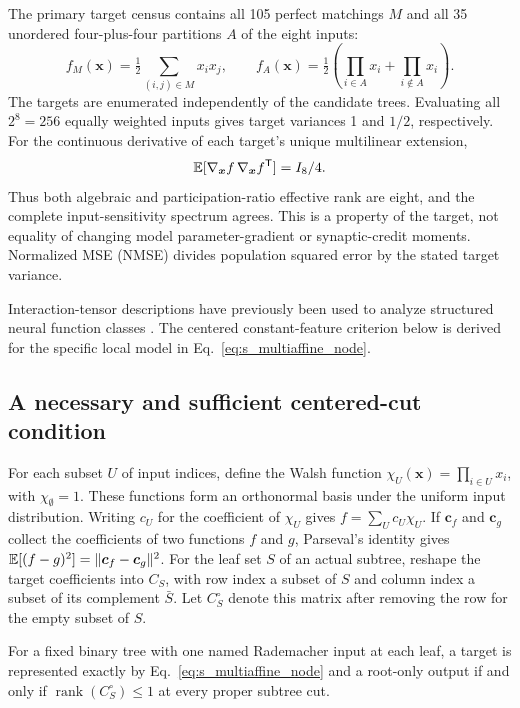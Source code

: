 The primary target census contains all 105 perfect matchings $M$ and all
35 unordered four-plus-four partitions $A$ of the eight inputs:
\begin{equation}
 f_M(\bm x)=\tfrac12\sum_{(i,j)\in M}x_ix_j,
 \qquad
 f_A(\bm x)=\tfrac12\left(\prod_{i\in A}x_i+
                              \prod_{i\notin A}x_i\right).
 \label{eq:s_interaction_targets}
\end{equation}
The targets are enumerated independently of the candidate trees. Evaluating
all $2^8=256$ equally weighted inputs gives target variances 1 and $1/2$,
respectively. For the continuous derivative of each target's unique
multilinear extension,
\begin{equation}
 \mathbb{E}[\nabla_{\bm x}f\,\nabla_{\bm x}f^{\mathsf T}]=I_8/4.
 \label{eq:s_equal_input_sensitivity}
\end{equation}
Thus both algebraic and participation-ratio effective rank are eight, and
the complete input-sensitivity spectrum agrees. This is a property of the
target, not equality of changing model parameter-gradient or synaptic-credit
moments. Normalized MSE (NMSE) divides population squared error by the stated
target variance.

Interaction-tensor descriptions have previously been used to analyze
structured neural function classes \citep{cohen2016tensor}. The centered
constant-feature criterion below is derived for the specific local model in
Eq.~\ref{eq:s_multiaffine_node}.

\subsection{A necessary and sufficient centered-cut condition}
\label{note:centered_cut_theorem}

For each subset $U$ of input indices, define the Walsh function
$\chi_U(\bm x)=\prod_{i\in U}x_i$, with $\chi_\emptyset=1$. These
functions form an orthonormal basis under the uniform input distribution.
Writing $c_U$ for the coefficient of $\chi_U$ gives
$f=\sum_U c_U\chi_U$. If $\bm c_f$ and $\bm c_g$ collect the
coefficients of two functions $f$ and $g$, Parseval's identity gives
$\mathbb{E}[(f-g)^2]=\|\bm c_f-\bm c_g\|^2$. For the leaf set $S$ of an actual
subtree, reshape the target coefficients into $C_S$, with row index a subset
of $S$ and column index a subset of its complement $\bar S$. Let $C_S^\circ$ denote
this matrix after removing the row for the empty subset of $S$.

\begin{proposition}
\label{prop:s_centered_tree_iff}
For a fixed binary tree with one named Rademacher input at each leaf, a target
is represented exactly by Eq.~\ref{eq:s_multiaffine_node} and a root-only
output if and only if $\operatorname{rank}(C_S^\circ)\leq1$ at every proper
subtree cut.
\end{proposition}

